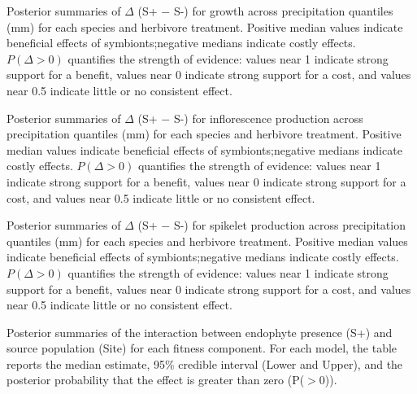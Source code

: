 \documentclass[12pt]{article}\usepackage[]{graphicx}\usepackage[dvipsnames]{xcolor}
\begin{document}
{\begin{table}[ht]
    \centering
    \caption{Posterior summaries of $\Delta$ (S+ $-$ S-) for growth across precipitation quantiles (mm) for each species and herbivore treatment.
    Positive median values indicate beneficial effects of symbionts;negative medians indicate costly effects. 
    $P(\Delta>0)$ quantifies the strength of evidence: values near 1 indicate
    strong support for a benefit, values near 0 indicate strong support for a cost, and values near 0.5 indicate little or no consistent effect.}
    \label{tab:delta_summary_grow}
    
\end{table}
\clearpage

\begin{table}[ht]
    \centering
    \caption{Posterior summaries of $\Delta$ (S+ $-$ S-) for inflorescence production across precipitation quantiles (mm) for each species and herbivore treatment.
    Positive median values indicate beneficial effects of symbionts;negative medians indicate costly effects.
    $P(\Delta>0)$ quantifies the strength of evidence: values near 1 indicate strong support for a benefit, values near 0 indicate strong support for a cost, and values near 0.5 indicate little or no consistent effect.}
    \label{tab:delta_summary_flow}
    
\end{table}
\clearpage

\begin{table}[ht]
    \centering
    \caption{Posterior summaries of $\Delta$ (S+ $-$ S-) for spikelet production across precipitation quantiles (mm) for each species and herbivore treatment.
    Positive median values indicate beneficial effects of symbionts;negative medians indicate costly effects.
    $P(\Delta>0)$ quantifies the strength of evidence: values near 1 indicate strong support for a benefit, values near 0 indicate strong support for a cost, and values near 0.5 indicate little or no consistent effect.}
    \label{tab:delta_summary_spike}
    
\end{table}
\clearpage

\begin{table}[ht]
    \centering
    \small
       \caption{Posterior summaries of the interaction between endophyte presence (S+) and source population (Site) for each fitness component. For each model, the table reports the median estimate, 95\% credible interval (Lower and Upper), and the posterior probability that the effect is greater than zero (P($>0$)).}
    \label{tab:posterior_soil}
    
\end{table}
\clearpage



}
\end{document}
